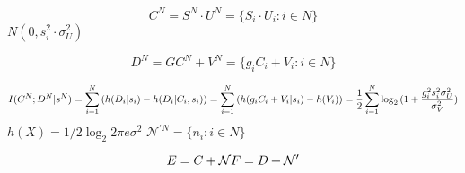 \begin{equation}
C^N= S^N \cdot U^N = \{ S_i\cdot U_i : i \in N \}
\end{equation}
$N(0, s_i^2 \cdot \sigma^2_U)$

\begin{equation}
D^N= GC^N + V^N = \{ g_i C_i + V_i : i \in N \}
\end{equation}

\begin{equation}
I(C^N; D^N|s^N)  = \sum_{i=1}^N{(h(D_i|s_i)-h(D_i|C_i,s_i))} \\
= \sum_{i=1}^N{(h( g_i C_i + V_i|s_i)-h(V_i))} \\
= \frac{1}{2}\sum_{i=1}^N{\log_2{(1+\frac{g_i^2s_i^2\sigma^2_U}{\sigma^2_V})}}
\end{equation}
$h(X)=1/2\log_2{2\pi e \sigma^2}$
$\mathcal{N}^{\prime N} = \{ n_i : i \in N \} $

\begin{equation}
E = C + \mathcal{N}\\
F = D + \mathcal{N}^{\prime }
\end{equation}